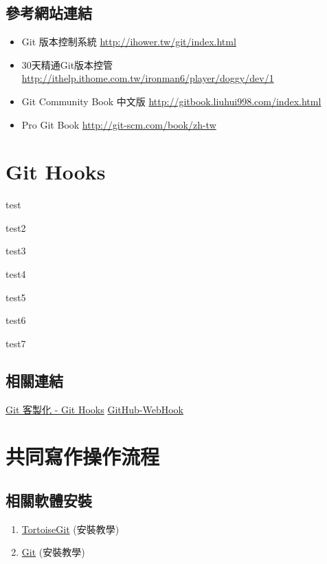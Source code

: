 \documentclass[letterpaper,10pt,english]{sphinxmanual}
\begin{document}
\section{參考網站連結}
\label{_doc/git/index:id2}\begin{itemize}
\item {} 
Git 版本控制系統 \href{http://ihower.tw/git/index.html}{http://ihower.tw/git/index.html}

\item {} 
30天精通Git版本控管 \href{http://ithelp.ithome.com.tw/ironman6/player/doggy/dev/1}{http://ithelp.ithome.com.tw/ironman6/player/doggy/dev/1}

\item {} 
Git Community Book 中文版 \href{http://gitbook.liuhui998.com/index.html}{http://gitbook.liuhui998.com/index.html}

\item {} 
Pro Git Book \href{http://git-scm.com/book/zh-tw}{http://git-scm.com/book/zh-tw}

\end{itemize}


\chapter{Git Hooks}
\label{_doc/git/git_hooks::doc}\label{_doc/git/git_hooks:git-hooks}
test

test2

test3

test4

test5

test6

test7


\section{相關連結}
\label{_doc/git/git_hooks:id1}
\href{http://git-scm.com/book/zh-tw/Git-客製化-Git-Hooks}{Git 客製化 - Git Hooks}
\href{https://github.com/xPaw/GitHub-WebHook}{GitHub-WebHook}


\chapter{共同寫作操作流程}
\label{_doc/writing/index::doc}\label{_doc/writing/index:id1}

\section{相關軟體安裝}
\label{_doc/writing/index:id2}\begin{enumerate}
\item {} 
\href{https://code.google.com/p/tortoisegit/}{TortoiseGit} (安裝教學)

\item {} 
\href{http://www.git-scm.com/download/win}{Git} (安裝教學)

\end{enumerate}
\end{document}
